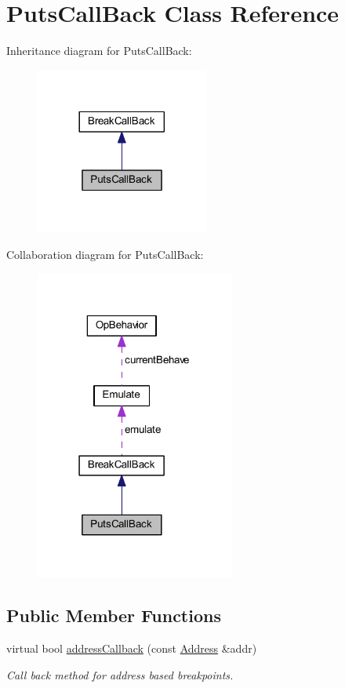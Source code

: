 \hypertarget{class_puts_call_back}{}\section{Puts\+Call\+Back Class Reference}
\label{class_puts_call_back}


Inheritance diagram for Puts\+Call\+Back\+:
\nopagebreak
\begin{figure}[H]
\begin{center}
\leavevmode
\includegraphics[width=161pt]{class_puts_call_back__inherit__graph}
\end{center}
\end{figure}


Collaboration diagram for Puts\+Call\+Back\+:
\nopagebreak
\begin{figure}[H]
\begin{center}
\leavevmode
\includegraphics[width=186pt]{class_puts_call_back__coll__graph}
\end{center}
\end{figure}
\subsection*{Public Member Functions}
\begin{DoxyCompactItemize}
\item 
virtual bool \mbox{\hyperlink{class_puts_call_back_aed006bcf40674841a1799fa1374017b9}{address\+Callback}} (const \mbox{\hyperlink{class_address}{Address}} \&addr)
\begin{DoxyCompactList}\small\item\em Call back method for address based breakpoints. \end{DoxyCompactList}\end{DoxyCompactItemize}
